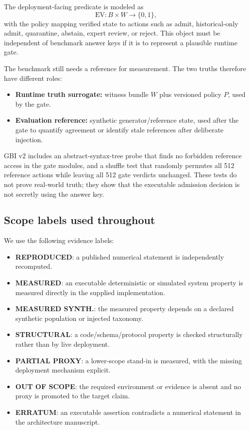 \documentclass[11pt]{article}
\newcommand{\EV}{\mathrm{EV}}
\begin{document}
The deployment-facing predicate is modeled as
\[
\EV:B\times W\rightarrow\{0,1\},
\]
with the policy mapping verified state to actions such as admit, historical-only admit, quarantine, abstain, expert review, or reject. This object must be independent of benchmark answer keys if it is to represent a plausible runtime gate.

The benchmark still needs a reference for measurement. The two truths therefore have different roles:

\begin{itemize}
  \item \textbf{Runtime truth surrogate:} witness bundle \(W\) plus versioned policy \(P\), used by the gate.
  \item \textbf{Evaluation reference:} synthetic generator/reference state, used after the gate to quantify agreement or identify stale references after deliberate injection.
\end{itemize}

GBI v2 includes an abstract-syntax-tree probe that finds no forbidden reference access in the gate modules, and a shuffle test that randomly permutes all 512 reference actions while leaving all 512 gate verdicts unchanged. These tests do not prove real-world truth; they show that the executable admission decision is not secretly using the answer key.

\subsection{Scope labels used throughout}

We use the following evidence labels:

\begin{itemize}
  \item \textbf{REPRODUCED}: a published numerical statement is independently recomputed.
  \item \textbf{MEASURED}: an executable deterministic or simulated system property is measured directly in the supplied implementation.
  \item \textbf{MEASURED SYNTH.}: the measured property depends on a declared synthetic population or injected taxonomy.
  \item \textbf{STRUCTURAL}: a code/schema/protocol property is checked structurally rather than by live deployment.
  \item \textbf{PARTIAL PROXY}: a lower-scope stand-in is measured, with the missing deployment mechanism explicit.
  \item \textbf{OUT OF SCOPE}: the required environment or evidence is absent and no proxy is promoted to the target claim.
  \item \textbf{ERRATUM}: an executable assertion contradicts a numerical statement in the architecture manuscript.
\end{itemize}
\end{document}
